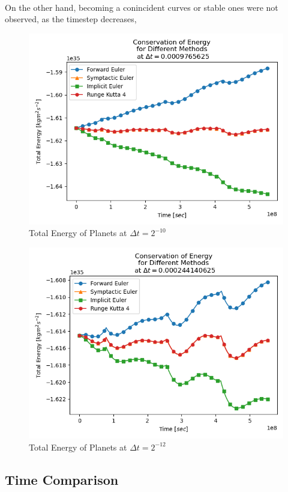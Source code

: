 \documentclass[letterpaper,12pt]{article}
\begin{document}
    \paragraph{} On the other hand, becoming a conincident curves or stable ones were not observed, as the timestep decreases, 
    \begin{figure}[H]
    \centerline{\includegraphics[width=0.7\linewidth]{figures/42.png}}
    \caption{Total Energy of Planets at $\Delta t = 2^{-10}$}
    \label{fig:42}
    \end{figure}
    
    \begin{figure}[H]
    \centerline{\includegraphics[width=0.7\linewidth]{figures/43.png}}
    \caption{Total Energy of Planets at $\Delta t = 2^{-12}$}
    \label{fig:43}
    \end{figure}
    
\pagebreak
\subsection{Time Comparison}
\end{document}
